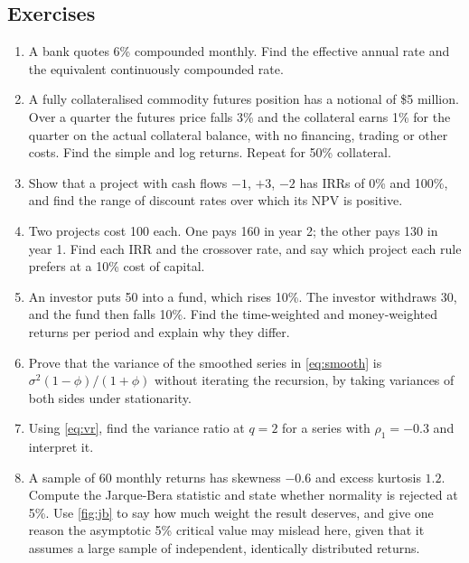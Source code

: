 \begin{chapterrefs}
\FloatBarrier
\section{Exercises}
\label{sec:exercises}

\begin{enumerate}[label=\textbf{\thechapter.\arabic*}, leftmargin=*]
  \item\label{exr:1} A bank quotes 6\% compounded monthly. Find the effective annual rate and the
        equivalent continuously compounded rate.
  \item\label{exr:2} A fully collateralised commodity futures position has a notional of \$5 million.
        Over a quarter the futures price falls 3\% and the collateral earns 1\% for the quarter on the
        actual collateral balance, with no financing, trading or other costs. Find the simple and log
        returns. Repeat for 50\% collateral.
  \item\label{exr:3} Show that a project with cash flows $-1$, $+3$, $-2$ has IRRs of 0\% and 100\%, and
        find the range of discount rates over which its NPV is positive.
  \item\label{exr:4} Two projects cost 100 each. One pays 160 in year 2; the other pays 130 in year 1.
        Find each IRR and the crossover rate, and say which project each rule prefers at a 10\% cost
        of capital.
  \item\label{exr:5} An investor puts 50 into a fund, which rises 10\%. The investor withdraws 30, and
        the fund then falls 10\%. Find the time-weighted and money-weighted returns per period and explain
        why they differ.
  \item\label{exr:6} Prove that the variance of the smoothed series in \cref{eq:smooth} is
        $\sigma^2(1-\phi)/(1+\phi)$ without iterating the recursion, by taking variances of both sides
        under stationarity.
  \item\label{exr:7} Using \cref{eq:vr}, find the variance ratio at $q=2$ for a series with $\rho_1 = -0.3$
        and interpret it.
  \item\label{exr:8} A sample of 60 monthly returns has skewness $-0.6$ and excess kurtosis $1.2$. Compute
        the Jarque-Bera statistic and state whether normality is rejected at 5\%. Use \cref{fig:jb}
        to say how much weight the result deserves, and give one reason the asymptotic 5\% critical value may mislead here, given that it assumes a
        large sample of independent, identically distributed returns.
\end{enumerate}


\end{chapterrefs}
